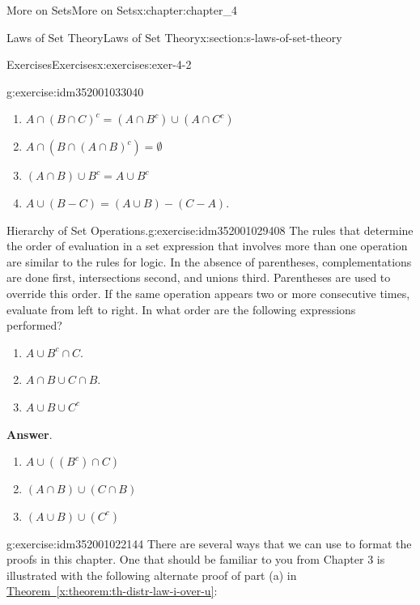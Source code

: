 \documentclass[oneside,10pt,]{book}
\newcommand{\blocktitlefont}{\relax}
\newcommand{\xreffont}{\relax}
\begin{document}
\begin{chapterptx}{More on Sets}{}{More on Sets}{}{}{x:chapter:chapter_4}
\begin{sectionptx}{Laws of Set Theory}{}{Laws of Set Theory}{}{}{x:section:s-laws-of-set-theory}
\begin{exercises-subsection}{Exercises}{}{Exercises}{}{}{x:exercises:exer-4-2}
\begin{divisionexercise}{4}{}{}{g:exercise:idm352001033040}
\par
%
\begin{enumerate}[label=(\alph*)]
\item{}\(\displaystyle A \cap (B\cap C)^c= (A\cap B^c)\cup (A\cap C^{c })\)%
\item{}\(\displaystyle A \cap (B\cap (A\cap B)^c)= \emptyset\)%
\item{}\(\displaystyle (A\cap B) \cup  B^c = A \cup  B^c\)%
\item{}\(A \cup  (B - C) = (A \cup  B) - (C - A)\).%
\end{enumerate}
%
\end{divisionexercise}%
\begin{divisionexercise}{5}{Hierarchy of Set Operations.}{}{g:exercise:idm352001029408}%
The rules that determine the order of evaluation in a set expression that involves more than one operation are similar to the rules for logic. In the absence of parentheses, complementations are done first, intersections second, and unions third. Parentheses are used to override this order. If the same operation appears two or more consecutive times, evaluate from left to right. In what order are the following expressions performed?%
\par
%
\begin{multicols}{2}
\begin{enumerate}[label=(\alph*)]
\item{}\(A \cup  B^c\cap C\).%
\item{}\(A\cap B \cup  C\cap B\).%
\item{}\(\displaystyle A \cup  B \cup  C^c\)%
\end{enumerate}
\end{multicols}
%
\par\smallskip%
\noindent\textbf{\blocktitlefont Answer}.\hypertarget{g:answer:idm352001025472}{}\quad{}%
\begin{multicols}{3}
\begin{enumerate}[label=(\alph*)]
\item{}\(\displaystyle A\cup ((B^c)\cap C)\)%
\item{}\(\displaystyle (A\cap B)\cup (C\cap B)\)%
\item{}\(\displaystyle (A\cup B)\cup (C^c)\)%
\end{enumerate}
\end{multicols}
%
\end{divisionexercise}%
\begin{divisionexercise}{6}{}{}{g:exercise:idm352001022144}%
There are several ways that we can use to format the proofs in this chapter. One that should be familiar to you from Chapter 3 is illustrated with the following alternate proof of part (a) in \hyperref[x:theorem:th-distr-law-i-over-u]{Theorem~{\xreffont\ref{x:theorem:th-distr-law-i-over-u}}}:%

\end{divisionexercise}
\end{exercises-subsection}
\end{sectionptx}
\end{chapterptx}
\end{document}
